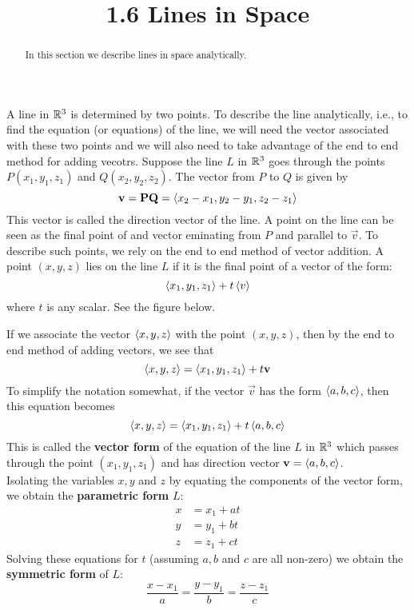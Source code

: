\documentclass[handout]{ximera}
\title{1.6 Lines in Space}
\begin{document}
\begin{abstract}
In this section we describe lines in space analytically.
\end{abstract}
 
\maketitle

A line in $\mathbb R^3$ is determined by two points. To describe the line analytically, i.e., to find the equation (or equations) of the line,
we will need the vector associated with these two points and we will also need to take advantage of the end to end method for adding vecotrs.
Suppose the line $L$ in $\mathbb R^3$ goes through the points $P(x_1, y_1, z_1)$ and $Q(x_2, y_2, z_2)$. The vector from $P$ to $Q$ is given by
\[
\mathbf{v} = \mathbf{PQ} = \left\langle x_2-x_1,y_2-y_1,z_2-z_1\right\rangle
\]
This vector is called the direction vector of the line. 
A point on the line can be seen as the final point of and vector eminating from $P$ and parallel to $\vec{v}$.
To describe such points, we rely on the end to end method of vector addition. A point $(x, y, z)$ lies on the line $L$ if
it is the final point of a vector of the form:
\[
\left\langle x_1, y_1, z_1\right\rangle + t\left\langle v\right\rangle
\]
where $t$ is any scalar. See the figure below.

\begin{image}
\end{image}
 
If we associate the vector $\left\langle x, y, z\right\rangle$ with the point $(x, y, z)$, then by the end to end method of adding vectors, we see that
\[
\left\langle x, y, z\right\rangle = \left\langle x_1, y_1, z_1\right\rangle + t\mathbf{v}
\]
To simplify the notation somewhat, if the vector $\vec{v}$ has the form $\left\langle a, b, c\right\rangle$, then this equation becomes
\[
\left\langle x, y, z\right\rangle = \left\langle x_1, y_1, z_1\right\rangle + t\left\langle a, b, c\right\rangle
\]
This is called the {\bf vector form} of the equation of the line $L$ in $\mathbb R^3$ which passes through the 
point $(x_1, y_1, z_1)$ and has direction vector $\mathbf{v} = \left\langle a, b, c\right\rangle$.\\
Isolating the variables $x, y$ and $z$ by equating the components of the vector form, we obtain the {\bf parametric form} $L$:
\begin{align*}
x &= x_1 + at\\
y &= y_1 + bt\\
z &= z_1 + ct
\end{align*}
Solving these equations for $t$ (assuming $a, b$ and $c$ are all non-zero) we obtain the {\bf symmetric form} of $L$:
\[
\frac{x-x_1}{a} = \frac{y-y_1}{b} = \frac{z-z_1}{c}
\]
\end{document}
